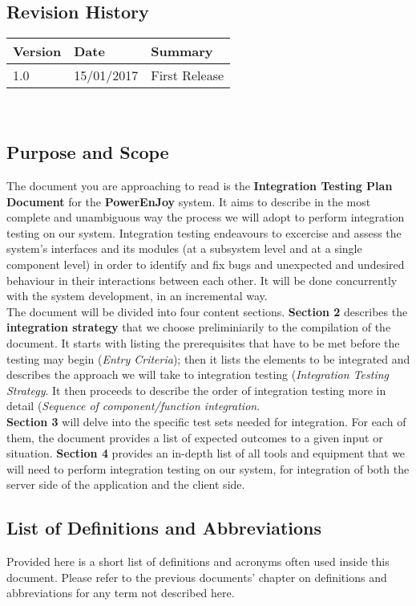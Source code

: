 \subsection{Revision History}
	\begin{tabular}{ |l|l|l| }
		\hline
		Version & Date & Summary\\ \hline
		1.0 & 15/01/2017 & First Release\\ \hline
	\end{tabular}
	\\

\subsection{Purpose and Scope}
	The document you are approaching to read is the \textbf{Integration Testing Plan Document} for the \textbf{PowerEnJoy} system. It aims to describe in the most complete and unambiguous way the process we will adopt to perform integration testing on our system. Integration testing endeavours to excercise and assess the system's interfaces and its modules (at a subsystem level and at a single component level) in order to identify and fix bugs and unexpected and undesired behaviour in their interactions between each other. It will be done concurrently with the system development, in an incremental way.\\
	The document will be divided into four content sections. \textbf{Section 2} describes the \textbf{integration strategy} that we choose preliminiarily to the compilation of the document. It starts with listing the prerequisites that have to be met before the testing may begin (\textit{Entry Criteria}); then it lists the elements to be integrated and describes the approach we will take to integration testing (\textit{Integration Testing Strategy}. It then proceeds to describe the order of integration testing more in detail (\textit{Sequence of component/function integration}.\\
	\textbf{Section 3} will delve into the specific test sets needed for integration. For each of them, the document provides a list of expected outcomes to a given input or situation. \textbf{Section 4} provides an in-depth list of all tools and equipment that we will need to perform integration testing on our system, for integration of both the server side of the application and the client side. 

\subsection{List of Definitions and Abbreviations}
	Provided here is a short list of definitions and acronyms often used inside this document. Please refer to the previous documents' chapter on definitions and abbreviations for any term not described here.
